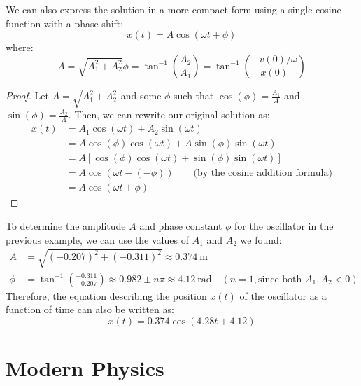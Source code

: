 \documentclass[11pt]{report}
\begin{document}
\begin{theorem} We can also express the solution in a more compact form using a single cosine function with a phase shift:
\begin{equation}
    x(t) = A \cos(\omega t + \phi)
\end{equation}
where:
\begin{subequations}
    \begin{equation}
        A = \sqrt{A_1^2 + A_2^2}
    \end{equation}
    \begin{equation}
        \phi = \tan^{-1}\left(\frac{A_2}{A_1}\right) = \tan^{-1}\left(\frac{-v(0)/\omega}{x(0)}\right)
    \end{equation}
\end{subequations}
\end{theorem}
\begin{proof}
    Let $A = \sqrt{A_1^2 + A_2^2}$ and some $\phi$ such that $\cos(\phi) = \frac{A_1}{A}$ and $\sin(\phi) = \frac{A_2}{A}$. Then, we can rewrite our original solution as:
    \begin{align*}
        x(t) &= A_1 \cos(\omega t) + A_2 \sin(\omega t) \\
        &= A \cos(\phi) \cos(\omega t) + A \sin(\phi) \sin(\omega t) \\
        &= A [\cos(\phi) \cos(\omega t) + \sin(\phi) \sin(\omega t)] \\ 
        &= A \cos(\omega t - (-\phi)) \qquad \text{(by the cosine addition formula)} \\
        &= A \cos(\omega t + \phi)
    \end{align*}
\end{proof}
\begin{example}
    To determine the amplitude \(A\) and phase constant \(\phi\) for the oscillator in the previous example, we can use the values of \(A_1\) and \(A_2\) we found:
    \begin{align*}
        A &= \sqrt{(-0.207)^2 + (-0.311)^2} \approx 0.374\ \mathrm{m} \\
        \phi &= \tan^{-1}\left(\frac{-0.311}{-0.207}\right) \approx 0.982 \pm n\pi \approx 4.12\ \mathrm{rad} \quad (n=1, \text{since both } A_1, A_2 < 0)
    \end{align*}
    Therefore, the equation describing the position \(x(t)\) of the oscillator as a function of time can also be written as:
    $$
    x(t) = 0.374 \cos(4.28 t + 4.12)
    $$
\end{example}


\chapter{Modern Physics}
\end{document}
